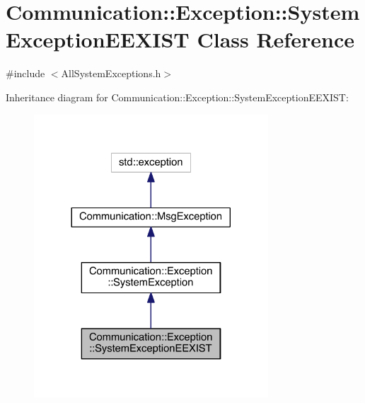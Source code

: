 \hypertarget{class_communication_1_1_exception_1_1_system_exception_e_e_x_i_s_t}{}\section{Communication\+:\+:Exception\+:\+:System\+Exception\+E\+E\+X\+I\+S\+T Class Reference}
\label{class_communication_1_1_exception_1_1_system_exception_e_e_x_i_s_t}


{\ttfamily \#include $<$All\+System\+Exceptions.\+h$>$}



Inheritance diagram for Communication\+:\+:Exception\+:\+:System\+Exception\+E\+E\+X\+I\+S\+T\+:\nopagebreak
\begin{figure}[H]
\begin{center}
\leavevmode
\includegraphics[width=248pt]{class_communication_1_1_exception_1_1_system_exception_e_e_x_i_s_t__inherit__graph}
\end{center}
\end{figure}


